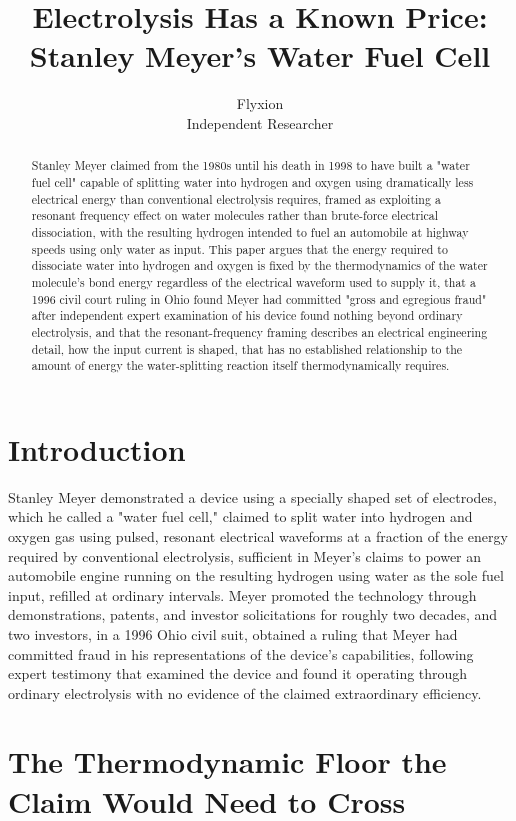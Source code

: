 \documentclass[11pt]{article}
\title{Electrolysis Has a Known Price: Stanley Meyer's Water Fuel Cell}
\author{Flyxion \\ \small Independent Researcher}
\date{}
\begin{document}
\maketitle

\begin{abstract}
Stanley Meyer claimed from the 1980s until his death in 1998 to have built a "water fuel cell" capable of splitting water into hydrogen and oxygen using dramatically less electrical energy than conventional electrolysis requires, framed as exploiting a resonant frequency effect on water molecules rather than brute-force electrical dissociation, with the resulting hydrogen intended to fuel an automobile at highway speeds using only water as input. This paper argues that the energy required to dissociate water into hydrogen and oxygen is fixed by the thermodynamics of the water molecule's bond energy regardless of the electrical waveform used to supply it, that a 1996 civil court ruling in Ohio found Meyer had committed "gross and egregious fraud" after independent expert examination of his device found nothing beyond ordinary electrolysis, and that the resonant-frequency framing describes an electrical engineering detail, how the input current is shaped, that has no established relationship to the amount of energy the water-splitting reaction itself thermodynamically requires.
\end{abstract}

\section{Introduction}

Stanley Meyer demonstrated a device using a specially shaped set of electrodes, which he called a "water fuel cell," claimed to split water into hydrogen and oxygen gas using pulsed, resonant electrical waveforms at a fraction of the energy required by conventional electrolysis, sufficient in Meyer's claims to power an automobile engine running on the resulting hydrogen using water as the sole fuel input, refilled at ordinary intervals. Meyer promoted the technology through demonstrations, patents, and investor solicitations for roughly two decades, and two investors, in a 1996 Ohio civil suit, obtained a ruling that Meyer had committed fraud in his representations of the device's capabilities, following expert testimony that examined the device and found it operating through ordinary electrolysis with no evidence of the claimed extraordinary efficiency.

\section{The Thermodynamic Floor the Claim Would Need to Cross}
\end{document}

